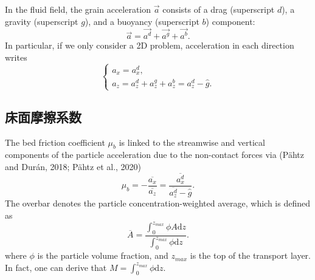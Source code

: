 \documentclass[12pt,a4paper]{article}
\newcommand{\diff}{\mathrm{d}} %
\begin{document}
In the fluid field, the grain acceleration $\vec{a}$ consists of a drag (superscript $d$), a gravity (superscript $g$), and a buoyancy (superscript $b$) component:
\begin{equation}
    \vec{a} = \vec{a^d} + \vec{a^g} + \vec{a^b}.
\end{equation}
In particular, if we only consider a 2D problem, acceleration in each direction writes
\begin{equation}
    \begin{cases}
        a_x = a_{x}^d, \\
        a_z = a_{z}^d + a_{z}^g + a_{z}^b = a_{z}^d - \hat{g}.
    \end{cases}
\end{equation}

\subsection{床面摩擦系数}
The bed friction coefficient $\mu_b$ is linked to the streamwise and vertical components of the particle acceleration due to the non-contact forces via (P\"ahtz and Dur\'an, 2018; P\"ahtz et al., 2020)
\begin{equation}
    \mu_b = -\frac{\overline{a_x}}{\overline{a_z}} = \frac{\overline{a_{x}^d}}{\overline{a_{z}^d} - \hat{g}}.
\end{equation}
 The overbar denotes the particle concentration-weighted average, which is defined as
\begin{equation}
    \overline{A} = \frac{\int_0^{z_{max}} \phi A \diff z}{\int_0^{z_{max}} \phi \diff z}.
\end{equation}
where $\phi$ is the particle volume fraction, and $z_{max}$ is the top of the transport layer. In fact, one can derive that $M = \int_0^{z_{max}} \phi \diff z$.
\end{document}
